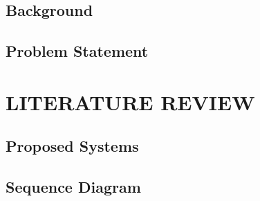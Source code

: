 





\newpage


\newpage


\tableofcontents
\thispagestyle{empty}
\newpage
\listoffigures
\newpage


\newpage



\subsection{Background}
\newpage


\subsection{Problem Statement}
\newpage



\newpage



\newpage


\section{LITERATURE REVIEW}
\newpage




\newpage


\subsection{Proposed Systems}
\newpage


\newpage



\newpage




\begingroup
\let\clearpage\relax



\endgroup

\newpage



\newpage



\newpage

\subsection{Sequence Diagram}
\newpage


